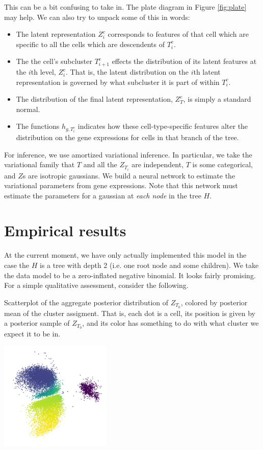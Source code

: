 This can be a bit confusing to take in.  The plate diagram in Figure \ref{fig:plate} may help.  We can also try to unpack some of this in words:

\begin{itemize}
\item The latent representation $Z^c_i$ corresponds to features of that cell which are specific to all the cells which are descendents of $T^c_i$.
\item The the cell's subcluster $T^c_{i+1}$ effects the distribution of its latent features at the $i$th level, $Z^c_i$.  That is, the latent distribution on the $i$th latent representation is governed by what subcluster it is part of within $T^c_i$.
\item The distribution of the final latent representation, $Z^c_T$, is simply a standard normal.
\item The functions $h_{g,T^c_i}$ indicates how these cell-type-specific features alter the distribution on the gene expressions for cells in that branch of the tree.  
\end{itemize}

For inference, we use amortized variational inference.  In particular, we take the variational family that $T$ and all the $Z_{T_i}$ are independent, $T$ is some categorical, and $Z$s are isotropic gaussians.  We build a neural network to estimate the variational parameters from gene expressions.  Note that this network must estimate the parameters for a gaussian at \emph{each node} in the tree $H$.

\section{Empirical results}

At the current moment, we have only actually implemented this model in the case the $H$ is a tree with depth 2 (i.e. one root node and some children).  We take the data model to be a zero-inflated negative binomial.  It looks fairly promising.  For a simple qualitative assessment, consider the following.

Scatterplot of the aggregate posterior distribution of $Z_{T_0}$, colored by posterior mean of the cluster assigment.  That is, each dot is a cell, its position is given by a posterior sample of $Z_{T_0}$, and its color has something to do with what cluster we expect it to be in.  

\includegraphics[width=0.4\textwidth]{pics/Z1}

